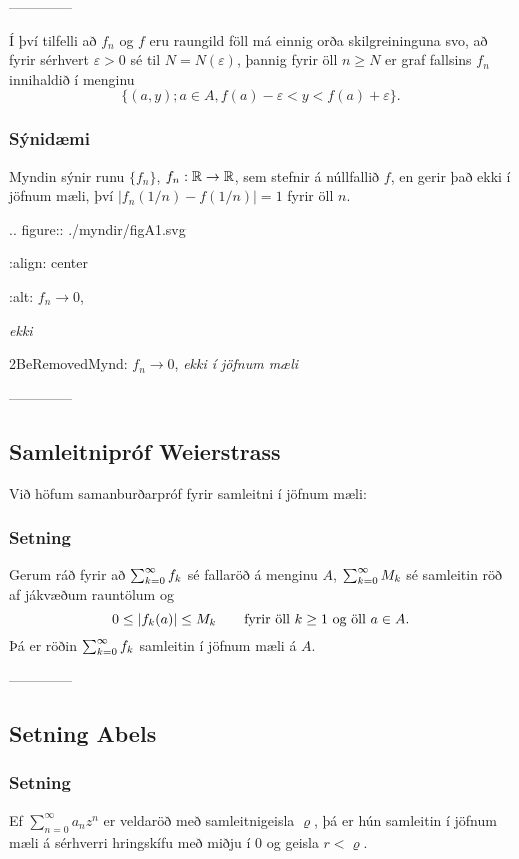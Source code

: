 --------------



\medskip
Í því tilfelli að $f_n$ og $f$ eru raungild föll 
má einnig orða skilgreininguna svo, að fyrir sérhvert $\varepsilon>0$
sé til $N=N(\varepsilon)$, þannig fyrir öll $n\geq N$ er graf fallsins 
$f_n$ innihaldið í menginu 
$$\{(a,y); a\in A, f(a)-\varepsilon<y<f(a)+\varepsilon\}.
$$

\subsubsection{Sýnidæmi} 
Myndin sýnir runu $\{f_n\}$, $f_n:{\mathbb R}\to {\mathbb R}$, sem stefnir á
núllfallið $f$, en gerir það ekki í jöfnum mæli, því
$|f_n(1/n)-f(1/n)|=1$ fyrir öll $n$.  

.. figure:: ./myndir/figA1.svg

    :align: center

    :alt: $f_n\to 0$, {\it ekki

    2BeRemovedMynd: $f_n\to 0$, {\it ekki
 í jöfnum mæli}}


--------------




\subsection*{Samleitnipróf Weierstrass}

Við höfum  samanburðarpróf fyrir samleitni í jöfnum mæli:

\subsubsection{Setning}  Gerum ráð
fyrir að $\sum_{k=0}\sp 
\infty f_k$ sé fallaröð á menginu $A$,  $\sum_{k=0}\sp
\infty M_k$ sé samleitin röð af jákvæðum rauntölum og 
$$0\leq |f_k(a)| \leq M_k \qquad \text{fyrir öll  $k\geq 1$ og öll $
a\in A$.}
$$
Þá er röðin $\sum_{k=0}\sp \infty f_k$ samleitin í jöfnum mæli á
$A$.


--------------




\subsection*{Setning Abels}

\subsubsection{Setning}
Ef $\sum_{n=0}^\infty a_nz^n$ er veldaröð með samleitnigeisla
$\varrho$, þá er hún samleitin í jöfnum mæli á sérhverri hringskífu
með miðju í $0$ og geisla $r<\varrho$. 


